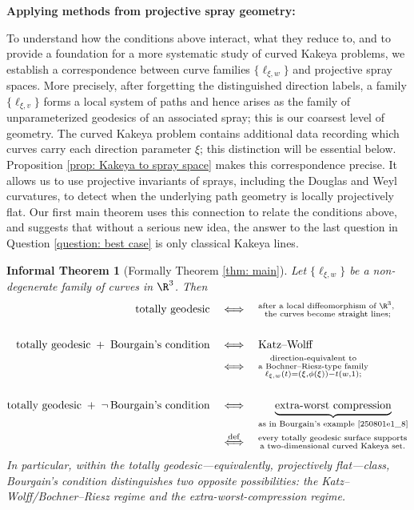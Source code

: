 \documentclass{article}
\numberwithin{equation}{section}
\theoremstyle{plain}
\newtheorem{informaltheorem}[theorem]{Informal Theorem}
\begin{document}
\medskip 

\noindent \textbf{Applying methods from projective spray geometry:}

To understand how the conditions above interact, what they reduce to, and to provide a foundation for a more systematic study of curved Kakeya problems, we establish a correspondence between curve families $\{\ell_{\xi,w}\}$ and projective spray spaces. More precisely, after forgetting the distinguished direction labels, a family $\{\ell_{\xi,v}\}$ forms a local system of paths and hence arises as the family of unparameterized geodesics of an associated spray; this is our coarsest level of geometry. The curved Kakeya problem contains additional data recording which curves carry each direction parameter $\xi$; this distinction will be essential below. Proposition \ref{prop: Kakeya to spray space} makes this correspondence precise. It allows us to use projective invariants of sprays, including the Douglas and Weyl curvatures, to detect when the underlying path geometry is locally projectively flat. Our first main theorem uses this connection to relate the conditions above, and suggests that without a serious new idea, the answer to the last question in Question \ref{question: best case} is only classical Kakeya lines. 

\begin{informaltheorem}[Formally Theorem \ref{thm: main}]
Let $\{\ell_{\xi,w}\}$ be a non-degenerate family of curves in $\R^3$.
Then
\[
\begin{aligned}
\text{\rm totally geodesic}
&\quad\Longleftrightarrow\quad
\substack{
\text{\rm after a local diffeomorphism of $\R^3$, }\\
\text{\rm the curves become straight lines};
}
\\[1.5em]
\text{\rm totally geodesic}
\;+\;
\text{\rm Bourgain's condition}
&\quad\Longleftrightarrow\quad
\text{\rm Katz--Wolff}
\\[-0.1em]
&\quad\Longleftrightarrow\quad
\substack{
\text{\rm direction-equivalent to}\\
\text{\rm a Bochner--Riesz-type family}\\[-0.1em]
\ell_{\xi,w}(t)
   =(\xi,\phi(\xi))-t(w,1);
}
\\[1.5em]
\text{\rm totally geodesic}
\;+\;
\neg\,\text{\rm Bourgain's condition}
&\quad\Longleftrightarrow\quad
\underbrace{
\text{\rm extra-worst compression}
}_{\text{\rm as in Bourgain's example \eqref{250801e1_8}}}
\\[-0.1em]
&\quad\overset{\rm def}{\Longleftrightarrow}\quad
\substack{
\text{\rm every totally geodesic surface supports}\\
\text{\rm a two-dimensional curved Kakeya set.}
}
\end{aligned}
\]
In particular, within the totally geodesic---equivalently, projectively
flat---class, Bourgain's condition distinguishes two opposite possibilities:
the Katz--Wolff/Bochner--Riesz regime and the extra-worst-compression regime. 
\end{informaltheorem}
\end{document}

